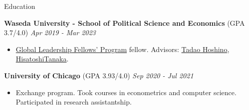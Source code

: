 \documentclass{resume} %
\begin{document}

\begin{rSection}{Education}

{\bf Waseda University - School of Political Science and Economics }(GPA 3.7/4.0) \hfill {\em Apr 2019 - Mar 2023} 

\begin{itemize}
\item \href{http://www2.cie-waseda.jp/glfp/jp/about/program.html}{Global Leadership Fellows' Program} fellow. Advisors: \href{https://tadaohoshino.wordpress.com/}{Tadao Hoshino}, \href{https://waseda.pure.elsevier.com/en/persons/hisatoshi-tanaka}{HisatoshiTanaka}.
\end{itemize}

{\bf University of Chicago }(GPA 3.93/4.0) \hfill {\em Sep 2020 - Jul 2021} 

\begin{itemize}
\item Exchange program. Took courses in econometrics and computer science. Participated in research assistantship. 
\end{itemize}

%


\end{rSection}
\end{document}
